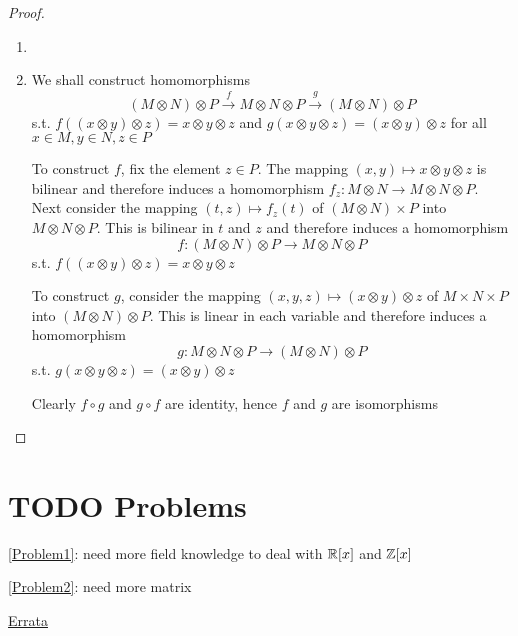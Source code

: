 \documentclass[11pt]{article}
\begin{document}
\begin{proof}
\begin{enumerate}
\item 

\item We shall construct homomorphisms
\begin{equation*}
(M\otimes N)\otimes P\xrightarrow{f}M\otimes N\otimes P\xrightarrow{g}(M\otimes N)\otimes P
\end{equation*}
s.t. \(f((x\otimes y)\otimes z)=x\otimes y\otimes z\) and \(g(x\otimes y\otimes z)=(x\otimes y)\otimes z\) for all \(x\in M,y\in N,z\in P\)

To construct \(f\), fix the element \(z\in P\). The mapping \((x,y)\mapsto x\otimes y\otimes z\) is bilinear and
therefore induces a homomorphism \(f_z:M\otimes N\to M\otimes N\otimes P\). Next consider the
mapping \((t,z)\mapsto f_z(t)\) of \((M\otimes N)\times P\) into \(M\otimes N\otimes P\). This is bilinear in \(t\)
and \(z\) and therefore induces a homomorphism
\begin{equation*}
f:(M\otimes N)\otimes P\to M\otimes N\otimes P
\end{equation*}
s.t. \(f((x\otimes y)\otimes z)=x\otimes y\otimes z\)

To construct \(g\), consider the mapping \((x,y,z)\mapsto(x\otimes y)\otimes z\) of \(M\times N\times P\)
into \((M\otimes N)\otimes P\). This is linear in each variable and therefore induces a homomorphism
\begin{equation*}
g:M\otimes N\otimes P\to(M\otimes N)\otimes P
\end{equation*}
s.t. \(g(x\otimes y\otimes z)=(x\otimes y)\otimes z\)

Clearly \(f\circ g\) and \(g\circ f\) are identity, hence \(f\) and \(g\) are isomorphisms
\end{enumerate}
\end{proof}



\section{{\bfseries\sffamily TODO} Problems}
\label{sec:orgb8fec3e}
\ref{Problem1}: need more field knowledge to deal with \(\mathbb{R}[x]\) and \(\mathbb{Z}[x]\)

\ref{Problem2}: need more matrix

\href{https://mathoverflow.net/questions/42241/errata-for-atiyah-macdonald}{Errata}
\end{document}
